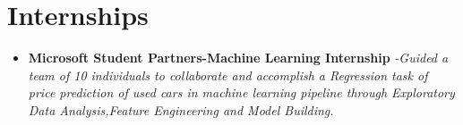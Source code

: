 \documentclass{article}
\begin{document}
    \section{Internships}
    \begin{itemize}
        \item{\textbf{\large{Microsoft Student Partners-Machine Learning Internship}}}
        \newline
        \textit{-Guided a team of 10 individuals to collaborate and accomplish a Regression task of price prediction of used cars in machine learning pipeline through Exploratory Data Analysis,Feature Engineering and Model Building.}
    \end{itemize}
\end{document}
